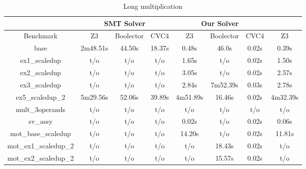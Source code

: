 \begin{table}[t]
\centering
\caption{Long multiplication}
\label{my-label}
\begin{tabular}{|c|c|c|c|c|c|c|c|}
\hline
                      & \multicolumn{3}{c|}{SMT Solver} & \multicolumn{3}{c|}{Our Solver} &          \\ \hline
Benchmark             & Z3        & Boolector  & CVC4   & Z3        & Boolector  & CVC4   & Z3       \\ \hline
base                  & 2m48.51s  & 44.50s     & 18.37s & 0.48s     & 46.0s      & 0.02s  & 0.39s    \\ \hline
ex1\_scaledup         & t/o       & t/o        & t/o    & 1.65s     & t/o        & 0.02s  & 1.50s    \\ \hline
ex2\_scaledup         & t/o       & t/o        & t/o    & 3.05s     & t/o        & 0.02s  & 2.57s    \\ \hline
ex3\_scaledup         & t/o       & t/o        & t/o    & 2.84s     & 7m52.39s   & 0.03s  & 2.78s    \\ \hline
ex5\_scaledup\_2      & 5m29.56s  & 52.06s     & 39.89s & 4m51.89s  & 16.46s     & 0.02s  & 4m32.39s \\ \hline
mult\_3operands       & t/o       & t/o        & t/o    & t/o       & t/o        & t/o    & t/o      \\ \hline
sv\_assy              & t/o       & t/o        & t/o    & 0.02s     & t/o        & 0.02s  & 0.06s    \\ \hline
mot\_base\_scaledup   & t/o       & t/o        & t/o    & 14.20s    & t/o        & 0.02s  & 11.81s   \\ \hline
mot\_ex1\_scaledup\_2 & t/o       & t/o        & t/o    & t/o       & 18.43s     & 0.02s  & t/o      \\ \hline
mot\_ex2\_scaledup\_2 & t/o       & t/o        & t/o    & t/o       & 15.57s     & 0.02s  & t/o      \\ \hline
\end{tabular}
\end{table}


